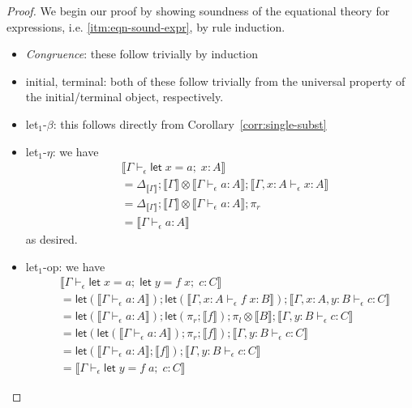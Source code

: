 \documentclass[acmsmall,screen,review]{acmart}
\newcommand{\ms}[1]{\ensuremath{\mathsf{#1}}}
\newcommand{\letexpr}[3]{\ensuremath{\ms{let}\;#1 = #2;\;#3}}
\newcommand{\bhyp}[2]{#1 : #2}
\newcommand{\hasty}[4]{#1 \vdash_{#2} #3: {#4}}
\newcommand{\brle}[1]{{\textsf{#1}}}
\newcommand{\dnt}[1]{\llbracket{#1}\rrbracket}
\newcommand{\dmor}[1]{{\Delta}_{#1}}
\newcommand{\lmor}[1]{\ms{let}(#1)}
\begin{document}
\begin{proof}
  We begin our proof by showing soundness of the equational theory for expressions, i.e.
  \ref{itm:eqn-sound-expr}, by rule induction.
  \begin{itemize}[leftmargin=*]
    \item \emph{Congruence}: these follow trivially by induction
    \item \brle{initial}, \brle{terminal}: both of these follow trivially from the universal
    property of the initial/terminal object, respectively.
    \item \brle{let$_1$-$\beta$}: this follows directly from Corollary~\ref{corr:single-subst}
    \item \brle{let$_1$-$\eta$}: we have
    \begin{align*}
      & \dnt{\hasty{\Gamma}{\epsilon}{\letexpr{x}{a}{x}}{A}} \\
      & = \dmor{\dnt{\Gamma}} 
        ; \dnt{\Gamma} \otimes \dnt{\hasty{\Gamma}{\epsilon}{a}{A}}
        ; \dnt{\hasty{\Gamma, \bhyp{x}{A}}{\epsilon}{x}{A}} \\
      & = \dmor{\dnt{\Gamma}} 
      ; \dnt{\Gamma} \otimes \dnt{\hasty{\Gamma}{\epsilon}{a}{A}}
      ; \pi_r \\
      &= \dnt{\hasty{\Gamma}{\epsilon}{a}{A}}
    \end{align*}
    as desired.
    \item \brle{let$_1$-op}: we have
    \begin{align*}
      & \dnt{\hasty{\Gamma}{\epsilon}{\letexpr{x}{a}{\letexpr{y}{f\;x}{c}}}{C}} \\
      & = \lmor{\dnt{\hasty{\Gamma}{\epsilon}{a}{A}}}
        ; \lmor{\dnt{\hasty{\Gamma, \bhyp{x}{A}}{\epsilon}{f\;x}{B}}}
        ; \dnt{\hasty{\Gamma, \bhyp{x}{A}, \bhyp{y}{B}}{\epsilon}{c}{C}} \\
      & = \lmor{\dnt{\hasty{\Gamma}{\epsilon}{a}{A}}}
        ; \lmor{\pi_r ; \dnt{f}}
        ; \pi_l \otimes \dnt{B}
        ; \dnt{\hasty{\Gamma, \bhyp{y}{B}}{\epsilon}{c}{C}} \\
      & = \lmor{
            \lmor{\dnt{\hasty{\Gamma}{\epsilon}{a}{A}}} ; \pi_r ; \dnt{f}
          } ; \dnt{\hasty{\Gamma, \bhyp{y}{B}}{\epsilon}{c}{C}} \\
      & = \lmor{\dnt{\hasty{\Gamma}{\epsilon}{a}{A}} ; \dnt{f}}
        ; \dnt{\hasty{\Gamma, \bhyp{y}{B}}{\epsilon}{c}{C}} \\
      & = \dnt{\hasty{\Gamma}{\epsilon}{\letexpr{y}{f\;a}{c}}{C}}
    \end{align*}

\end{itemize}
\end{proof}
\end{document}
